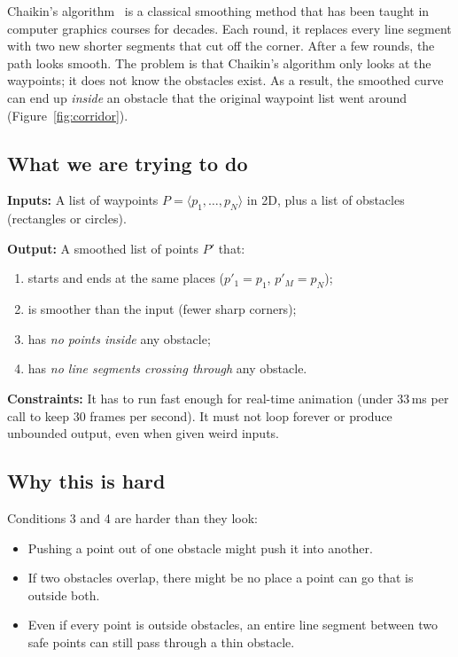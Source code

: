 \documentclass[10pt,a4paper,twocolumn]{article}
\begin{document}
Chaikin's algorithm~\cite{chaikin1974} is a classical smoothing method
that has been taught in computer graphics courses for decades. Each
round, it replaces every line segment with two new shorter segments that
cut off the corner. After a few rounds, the path looks smooth. The
problem is that Chaikin's algorithm only looks at the waypoints; it
does not know the obstacles exist. As a result, the smoothed curve can
end up \emph{inside} an obstacle that the original waypoint list went
around (Figure~\ref{fig:corridor}).

\subsection{What we are trying to do}
\noindent\textbf{Inputs:} A list of waypoints
$P=\langle p_1,\dots,p_N\rangle$ in 2D, plus a list of obstacles
(rectangles or circles).

\noindent\textbf{Output:} A smoothed list of points $P'$ that:
\begin{enumerate}
  \item starts and ends at the same places ($p'_1{=}p_1$, $p'_M{=}p_N$);
  \item is smoother than the input (fewer sharp corners);
  \item has \emph{no points inside} any obstacle;
  \item has \emph{no line segments crossing through} any obstacle.
\end{enumerate}

\noindent\textbf{Constraints:} It has to run fast enough for real-time
animation (under $33$\,ms per call to keep $30$ frames per second). It
must not loop forever or produce unbounded output, even when given
weird inputs.

\subsection{Why this is hard}
Conditions 3 and 4 are harder than they look:
\begin{itemize}
  \item Pushing a point out of one obstacle might push it into another.
  \item If two obstacles overlap, there might be no place a point can
        go that is outside both.
  \item Even if every point is outside obstacles, an entire line
        segment between two safe points can still pass through a thin
        obstacle.
\end{itemize}
\end{document}
